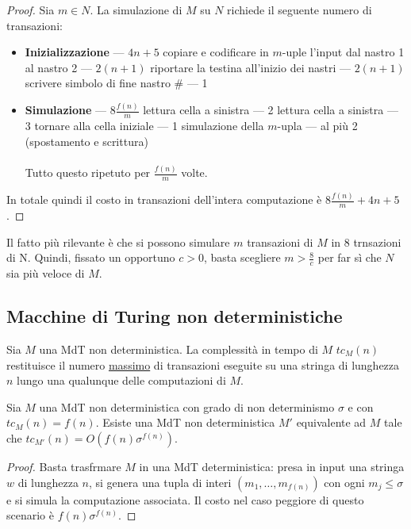 \begin{proof}
	Sia $m \in N$. La simulazione di $M$ su $N$ richiede il seguente numero di transazioni:
	\begin{itemize}
		\item \textbf{Inizializzazione} --- $4n + 5$
			\subitem copiare e codificare in $m$-uple l'input dal nastro 1 al nastro 2 --- $2(n+1)$
			\subitem riportare la testina all'inizio dei nastri --- $2(n+1)$
			\subitem scrivere simbolo di fine nastro $\#$ --- 1
		\item \textbf{Simulazione} --- $8\frac{f(n)}{m}$
			\subitem lettura cella a sinistra --- 2
			\subitem lettura cella a sinistra --- 3
			\subitem tornare alla cella iniziale --- 1
			\subitem simulazione della $m$-upla --- al più 2 (spostamento e scrittura) \\ \\
		Tutto questo ripetuto per $\frac{f(n)}{m}$ volte.
	\end{itemize}
	In totale quindi il costo in transazioni dell'intera computazione è $8\frac{f(n)}{m} + 4n + 5$.
\end{proof}

Il fatto più rilevante è che si possono simulare $m$ transazioni di $M$ in 8 trnsazioni di N. Quindi, fissato un opportuno $c > 0$, basta scegliere $m > \frac{8}{c}$ per far sì che $N$ sia più veloce di $M$.

\subsection{Macchine di Turing non deterministiche}

Sia $M$ una MdT non deterministica. La complessità in tempo di $M$ $tc_M(n)$ restituisce il numero \underline{massimo} di transazioni eseguite su una stringa di lunghezza $n$ lungo una qualunque delle computazioni di $M$. \\

\begin{lemm}
	Sia $M$ una MdT non deterministica con grado di non determinismo $\sigma$ e con $tc_M(n) = f(n)$. Esiste una MdT non deterministica $M'$ equivalente ad $M$ tale che $tc_{M'}(n) = O(f(n)\sigma^{f(n)})$.
\end{lemm}

\begin{proof}
	Basta trasfrmare $M$ in una MdT deterministica: presa in input una stringa $w$ di lunghezza $n$, si genera una tupla di interi $(m_1, \ldots, m_{f(n)})$ con ogni $m_j \leq \sigma$ e si simula la computazione associata. Il costo nel caso peggiore di questo scenario è $f(n)\sigma^{f(n)}$.
\end{proof}
